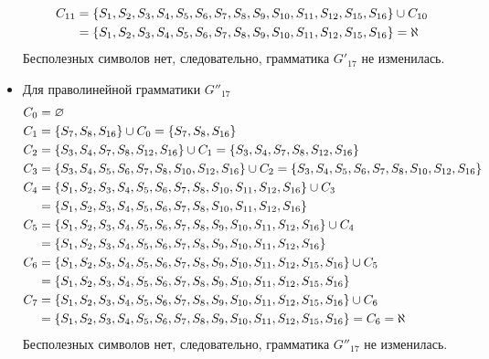 \begin{itemize}
\begin{align*}
		      C_{11} & = \left\{S_1, S_2, S_3, S_4, S_5, S_6, S_7, S_8, S_9, S_{10}, S_{11}, S_{12}, S_{15}, S_{16}\right\} \cup C_{10} \\
		             & = \left\{S_1, S_2, S_3, S_4, S_5, S_6, S_7, S_8, S_9, S_{10}, S_{11}, S_{12}, S_{15}, S_{16}\right\} = \aleph    \\
	      \end{align*}
	      Бесполезных символов нет, следовательно, грамматика \(G'_{17}\) не изменилась.
	\item Для праволинейной грамматики \(G''_{17}\)
	      \begin{align*}
		      C_{0} & = \varnothing                                                                                                                        \\
		      C_{1} & = \left\{S_{7}, S_{8}, S_{16}\right\} \cup C_{0} = \left\{S_{7}, S_{8}, S_{16}\right\}                                                                 \\
		      C_{2} & = \left\{S_3, S_4, S_7, S_8, S_{12}, S_{16}\right\} \cup C_{1} = \left\{S_3, S_4, S_7, S_8, S_{12}, S_{16}\right\}                                     \\
		      C_{3} & = \left\{S_3, S_4, S_5, S_6, S_7, S_8, S_{10}, S_{12}, S_{16}\right\} \cup C_{2} = \left\{S_3, S_4, S_5, S_6, S_7, S_8, S_{10}, S_{12}, S_{16}\right\} \\
		      C_{4} & = \left\{S_1, S_2, S_3, S_4, S_5, S_6, S_7, S_8, S_{10}, S_{11}, S_{12}, S_{16}\right\} \cup C_{3}                                            \\
		            & = \left\{S_1, S_2, S_3, S_4, S_5, S_6, S_7, S_8, S_{10}, S_{11}, S_{12}, S_{16}\right\}                                                       \\
		      C_{5} & = \left\{S_1, S_2, S_3, S_4, S_5, S_6, S_7, S_8, S_9, S_{10}, S_{11}, S_{12}, S_{16}\right\} \cup C_{4}                                       \\
		            & = \left\{S_1, S_2, S_3, S_4, S_5, S_6, S_7, S_8, S_9, S_{10}, S_{11}, S_{12}, S_{16}\right\}                                                  \\
		      C_{6} & = \left\{S_1, S_2, S_3, S_4, S_5, S_6, S_7, S_8, S_9, S_{10}, S_{11}, S_{12}, S_{15}, S_{16}\right\} \cup C_{5}                               \\
		            & = \left\{S_1, S_2, S_3, S_4, S_5, S_6, S_7, S_8, S_9, S_{10}, S_{11}, S_{12}, S_{15}, S_{16}\right\}                                          \\
		      C_{7} & = \left\{S_1, S_2, S_3, S_4, S_5, S_6, S_7, S_8, S_9, S_{10}, S_{11}, S_{12}, S_{15}, S_{16}\right\} \cup C_{6}                               \\
		            & = \left\{S_1, S_2, S_3, S_4, S_5, S_6, S_7, S_8, S_9, S_{10}, S_{11}, S_{12}, S_{15}, S_{16}\right\} = C_{6} = \aleph                         \\
	      \end{align*}
	      Бесполезных символов нет, следовательно, грамматика \(G''_{17}\) не изменилась.
\end{itemize}
